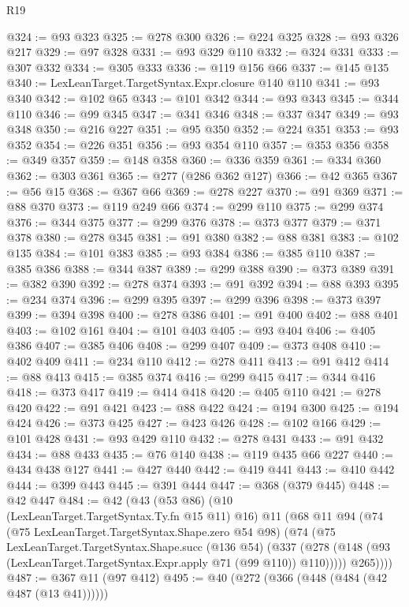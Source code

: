 \begin{lexlean}{R19}
\begin{coremodule}
@324 := @93 @323
@325 := @278 @300
@326 := @224 @325
@328 := @93 @326 @217
@329 := @97 @328
@331 := @93 @329 @110
@332 := @324 @331
@333 := @307 @332
@334 := @305 @333
@336 := @119 @156 @66
@337 := @145 @135
@340 := LexLeanTarget.TargetSyntax.Expr.closure @140 @110
@341 := @93 @340
@342 := @102 @65
@343 := @101 @342
@344 := @93 @343
@345 := @344 @110
@346 := @99 @345
@347 := @341 @346
@348 := @337 @347
@349 := @93 @348
@350 := @216 @227
@351 := @95 @350
@352 := @224 @351
@353 := @93 @352
@354 := @226 @351
@356 := @93 @354 @110
@357 := @353 @356
@358 := @349 @357
@359 := @148 @358
@360 := @336 @359
@361 := @334 @360
@362 := @303 @361
@365 := @277 (@286 @362 @127)
@366 := @42 @365
@367 := @56 @15
@368 := @367 @66
@369 := @278 @227
@370 := @91 @369
@371 := @88 @370
@373 := @119 @249 @66
@374 := @299 @110
@375 := @299 @374
@376 := @344 @375
@377 := @299 @376
@378 := @373 @377
@379 := @371 @378
@380 := @278 @345
@381 := @91 @380
@382 := @88 @381
@383 := @102 @135
@384 := @101 @383
@385 := @93 @384
@386 := @385 @110
@387 := @385 @386
@388 := @344 @387
@389 := @299 @388
@390 := @373 @389
@391 := @382 @390
@392 := @278 @374
@393 := @91 @392
@394 := @88 @393
@395 := @234 @374
@396 := @299 @395
@397 := @299 @396
@398 := @373 @397
@399 := @394 @398
@400 := @278 @386
@401 := @91 @400
@402 := @88 @401
@403 := @102 @161
@404 := @101 @403
@405 := @93 @404
@406 := @405 @386
@407 := @385 @406
@408 := @299 @407
@409 := @373 @408
@410 := @402 @409
@411 := @234 @110
@412 := @278 @411
@413 := @91 @412
@414 := @88 @413
@415 := @385 @374
@416 := @299 @415
@417 := @344 @416
@418 := @373 @417
@419 := @414 @418
@420 := @405 @110
@421 := @278 @420
@422 := @91 @421
@423 := @88 @422
@424 := @194 @300
@425 := @194 @424
@426 := @373 @425
@427 := @423 @426
@428 := @102 @166
@429 := @101 @428
@431 := @93 @429 @110
@432 := @278 @431
@433 := @91 @432
@434 := @88 @433
@435 := @76 @140
@438 := @119 @435 @66 @227
@440 := @434 @438 @127
@441 := @427 @440
@442 := @419 @441
@443 := @410 @442
@444 := @399 @443
@445 := @391 @444
@447 := @368 (@379 @445)
@448 := @42 @447
@484 := @42
    (@43
      (@53 @86)
      (@10 (LexLeanTarget.TargetSyntax.Ty.fn @15 @11) @16)
      @11
      (@68
        @11
        @94
        (@74
          (@75 LexLeanTarget.TargetSyntax.Shape.zero @54 @98)
          (@74
            (@75
              LexLeanTarget.TargetSyntax.Shape.succ
              (@136 @54)
              (@337
                (@278 (@148 (@93 (LexLeanTarget.TargetSyntax.Expr.apply @71 (@99 @110)) @110)))))
            @265))))
@487 := @367 @11 (@97 @412)
@495 := @40 (@272 (@366 (@448 (@484 (@42 @487 (@13 @41))))))

\end{coremodule}
\end{lexlean}
